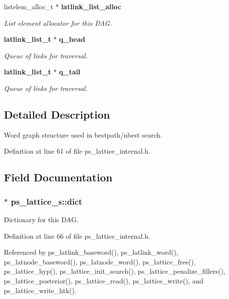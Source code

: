 \begin{DoxyCompactItemize}
listelem\-\_\-alloc\-\_\-t $\ast$ {\bf latlink\-\_\-list\-\_\-alloc}
\begin{DoxyCompactList}\small\item\em List element allocator for this D\-A\-G. \end{DoxyCompactList}\item 
{\bf latlink\-\_\-list\-\_\-t} $\ast$ {\bf q\-\_\-head}
\begin{DoxyCompactList}\small\item\em Queue of links for traversal. \end{DoxyCompactList}\item 
{\bf latlink\-\_\-list\-\_\-t} $\ast$ {\bf q\-\_\-tail}
\begin{DoxyCompactList}\small\item\em Queue of links for traversal. \end{DoxyCompactList}\end{DoxyCompactItemize}


\subsection{Detailed Description}
Word graph structure used in bestpath/nbest search. 

Definition at line 61 of file ps\-\_\-lattice\-\_\-internal.\-h.



\subsection{Field Documentation}
\subsubsection[{dict}]{$\ast$ ps\-\_\-lattice\-\_\-s\-::dict}\label{structps__lattice__s_a71865c59fae65743ef3c6b5aceb17da6}


Dictionary for this D\-A\-G. 



Definition at line 66 of file ps\-\_\-lattice\-\_\-internal.\-h.



Referenced by ps\-\_\-latlink\-\_\-baseword(), ps\-\_\-latlink\-\_\-word(), ps\-\_\-latnode\-\_\-baseword(), ps\-\_\-latnode\-\_\-word(), ps\-\_\-lattice\-\_\-free(), ps\-\_\-lattice\-\_\-hyp(), ps\-\_\-lattice\-\_\-init\-\_\-search(), ps\-\_\-lattice\-\_\-penalize\-\_\-fillers(), ps\-\_\-lattice\-\_\-posterior(), ps\-\_\-lattice\-\_\-read(), ps\-\_\-lattice\-\_\-write(), and ps\-\_\-lattice\-\_\-write\-\_\-htk().

